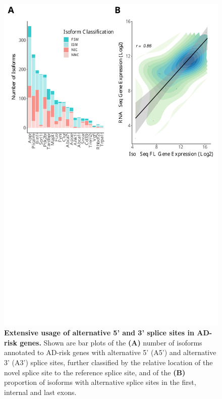 \begin{figure}[]
	\centering
	\includegraphics[page=10,trim={0 20cm 0 0cm},clip,scale = 0.55]{Figures/ONTvsIsoSeq.pdf}
	\captionsetup{width=0.95\textwidth}
	\caption[Characterisation of alternative 5' and 3' splice sites in AD-risk genes]%
	{\textbf{Extensive usage of alternative 5' and 3' splice sites in AD-risk genes.} Shown are bar plots of the \textbf{(A)} number of isoforms annotated to AD-risk genes with alternative 5' (A5') and alternative 3' (A3') splice sites, further classified by the relative location of the novel splice site to the reference splice site, and of the \textbf{(B)} proportion of isoforms with alternative splice sites in the first, internal and last exons.}
	\label{fig:A5A3_targeted}
\end{figure}

